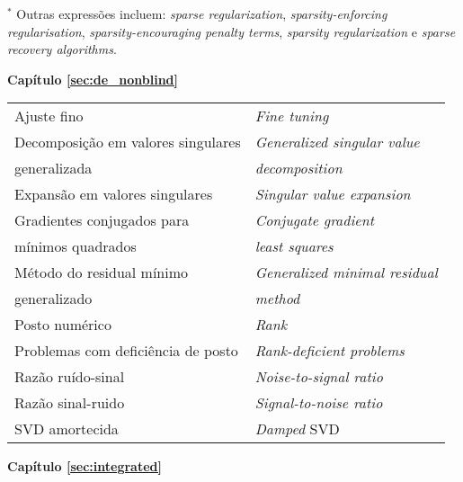\vspace{-4mm}

$^*$ Outras expressões incluem: \textit{sparse regularization}, \textit{sparsity-enforcing regularisation}, \textit{sparsity-encouraging penalty terms}, \textit{sparsity regularization} e \textit{sparse recovery algorithms}.

\newpage
\begin{center}
\textbf{Capítulo \ref{sec:de_nonblind}}
\end{center}

\begin{table}[H]
\begin{center}
\begin{tabular}{ l l }
Ajuste fino & \textit{Fine tuning} \\
Decomposição em valores singulares & \textit{Generalized singular value} \\
\quad generalizada & \quad \textit{decomposition} \\
Expansão em valores singulares & \textit{Singular value expansion} \\
Gradientes conjugados para  & \textit{Conjugate gradient} \\
\quad mínimos quadrados & \quad \textit{least squares} \\
Método do residual mínimo & \textit{Generalized minimal residual} \\
\quad generalizado & \quad \textit{method} \\
Posto numérico & \textit{Rank} \\
Problemas com deficiência de posto & \textit{Rank-deficient problems} \\
Razão ruído-sinal & \textit{Noise-to-signal ratio} \\
Razão sinal-ruido & \textit{Signal-to-noise ratio} \\
SVD amortecida & \textit{Damped} SVD \\
\end{tabular}
\end{center}
\end{table}


\begin{center}
\textbf{Capítulo \ref{sec:integrated}}
\end{center}

